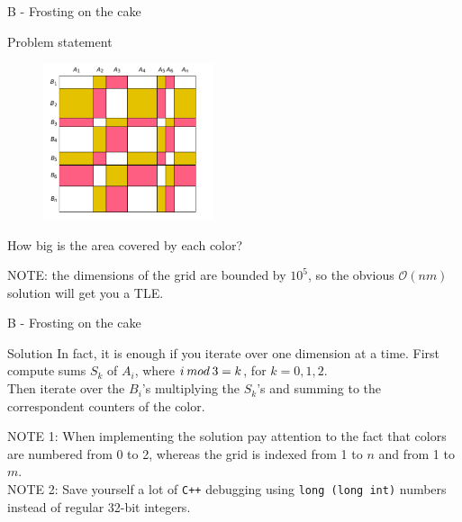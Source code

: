 \documentclass{beamer}
\begin{document}
    \begin{frame}{B - Frosting on the cake}
        \begin{block}{Problem statement}
            \begin{figure}[!htb]
                \includegraphics[width=50mm]{frosting}
            \end{figure}
            How big is the area covered by each color?\\
        \end{block}
        \alert{NOTE:} the dimensions of the grid are bounded by $10^5$, so the obvious
            $\mathcal{O}(nm)$ solution will get you a TLE.
    \end{frame}
    \begin{frame}{B - Frosting on the cake}
        \begin{block}{Solution}
            In fact, it is enough if you iterate over one dimension at a time. First compute
            sums $S_k$ of $A_i$, where $i\hspace{0.2em}mod\hspace{0.2em}3 = k$, for $k=0,1,2$.\\
            Then iterate over the $B_i$'s multiplying the $S_k$'s and summing to the correspondent
            counters of the color.
        \end{block}
        \alert{NOTE 1:} When implementing the solution pay attention to the fact that colors
        are numbered from 0 to 2, whereas the grid is indexed from 1 to $n$ and from 1 to $m$.\\
        \alert{NOTE 2:} Save yourself a lot of \texttt{C++} debugging using \texttt{long (long int)}
        numbers instead of regular 32-bit integers.  
    \end{frame}
\end{document}
